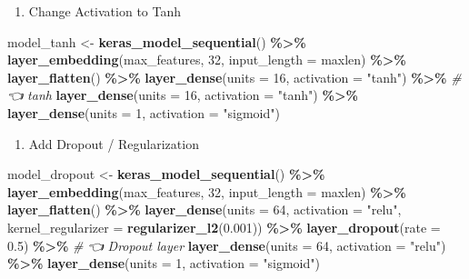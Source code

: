\documentclass[
]{article}
\newenvironment{Shaded}{\begin{snugshade}}{\end{snugshade}}
\newcommand{\AttributeTok}[1]{\textcolor[rgb]{0.13,0.29,0.53}{#1}}
\newcommand{\CommentTok}[1]{\textcolor[rgb]{0.56,0.35,0.01}{\textit{#1}}}
\newcommand{\DecValTok}[1]{\textcolor[rgb]{0.00,0.00,0.81}{#1}}
\newcommand{\FloatTok}[1]{\textcolor[rgb]{0.00,0.00,0.81}{#1}}
\newcommand{\FunctionTok}[1]{\textcolor[rgb]{0.13,0.29,0.53}{\textbf{#1}}}
\newcommand{\NormalTok}[1]{#1}
\newcommand{\OtherTok}[1]{\textcolor[rgb]{0.56,0.35,0.01}{#1}}
\newcommand{\SpecialCharTok}[1]{\textcolor[rgb]{0.81,0.36,0.00}{\textbf{#1}}}
\newcommand{\StringTok}[1]{\textcolor[rgb]{0.31,0.60,0.02}{#1}}
\providecommand{\tightlist}{%
  \setlength{\itemsep}{0pt}\setlength{\parskip}{0pt}}
\begin{document}
\begin{enumerate}
\def\labelenumi{\arabic{enumi}.}
\setcounter{enumi}{3}
\tightlist
\item
  Change Activation to Tanh
\end{enumerate}

\begin{Shaded}
\begin{Highlighting}[]
\NormalTok{model\_tanh }\OtherTok{\textless{}{-}} \FunctionTok{keras\_model\_sequential}\NormalTok{() }\SpecialCharTok{\%\textgreater{}\%}
  \FunctionTok{layer\_embedding}\NormalTok{(max\_features, }\DecValTok{32}\NormalTok{, }\AttributeTok{input\_length =}\NormalTok{ maxlen) }\SpecialCharTok{\%\textgreater{}\%}
  \FunctionTok{layer\_flatten}\NormalTok{() }\SpecialCharTok{\%\textgreater{}\%}
  \FunctionTok{layer\_dense}\NormalTok{(}\AttributeTok{units =} \DecValTok{16}\NormalTok{, }\AttributeTok{activation =} \StringTok{"tanh"}\NormalTok{) }\SpecialCharTok{\%\textgreater{}\%}   \CommentTok{\# 👈 tanh}
  \FunctionTok{layer\_dense}\NormalTok{(}\AttributeTok{units =} \DecValTok{16}\NormalTok{, }\AttributeTok{activation =} \StringTok{"tanh"}\NormalTok{) }\SpecialCharTok{\%\textgreater{}\%}
  \FunctionTok{layer\_dense}\NormalTok{(}\AttributeTok{units =} \DecValTok{1}\NormalTok{, }\AttributeTok{activation =} \StringTok{"sigmoid"}\NormalTok{)}
\end{Highlighting}
\end{Shaded}

\begin{enumerate}
\def\labelenumi{\arabic{enumi}.}
\setcounter{enumi}{4}
\tightlist
\item
  Add Dropout / Regularization
\end{enumerate}

\begin{Shaded}
\begin{Highlighting}[]
\NormalTok{model\_dropout }\OtherTok{\textless{}{-}} \FunctionTok{keras\_model\_sequential}\NormalTok{() }\SpecialCharTok{\%\textgreater{}\%}
  \FunctionTok{layer\_embedding}\NormalTok{(max\_features, }\DecValTok{32}\NormalTok{, }\AttributeTok{input\_length =}\NormalTok{ maxlen) }\SpecialCharTok{\%\textgreater{}\%}
  \FunctionTok{layer\_flatten}\NormalTok{() }\SpecialCharTok{\%\textgreater{}\%}
  \FunctionTok{layer\_dense}\NormalTok{(}\AttributeTok{units =} \DecValTok{64}\NormalTok{, }\AttributeTok{activation =} \StringTok{"relu"}\NormalTok{, }\AttributeTok{kernel\_regularizer =} \FunctionTok{regularizer\_l2}\NormalTok{(}\FloatTok{0.001}\NormalTok{)) }\SpecialCharTok{\%\textgreater{}\%}
  \FunctionTok{layer\_dropout}\NormalTok{(}\AttributeTok{rate =} \FloatTok{0.5}\NormalTok{) }\SpecialCharTok{\%\textgreater{}\%}   \CommentTok{\# 👈 Dropout layer}
  \FunctionTok{layer\_dense}\NormalTok{(}\AttributeTok{units =} \DecValTok{64}\NormalTok{, }\AttributeTok{activation =} \StringTok{"relu"}\NormalTok{) }\SpecialCharTok{\%\textgreater{}\%}
  \FunctionTok{layer\_dense}\NormalTok{(}\AttributeTok{units =} \DecValTok{1}\NormalTok{, }\AttributeTok{activation =} \StringTok{"sigmoid"}\NormalTok{)}
\end{Highlighting}
\end{Shaded}
\end{document}
